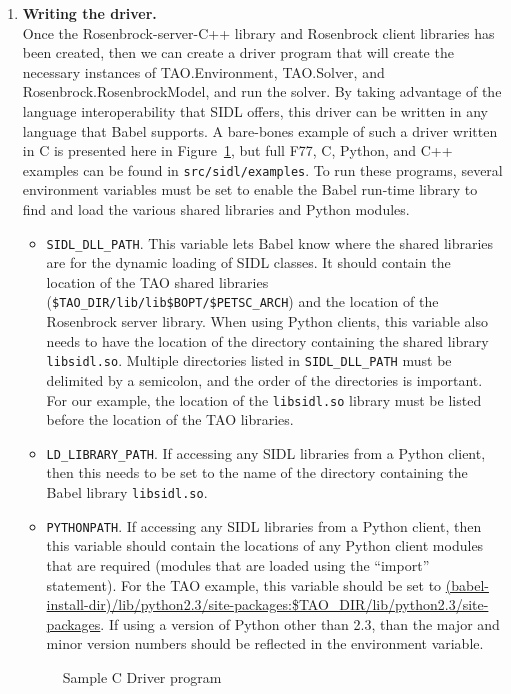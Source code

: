 \documentclass[doublespacing,12pt]{article}
\begin{document}
\begin{enumerate}
\item \textbf{Writing the driver.} \\
\label{sec:driverprogram}
Once the Rosen\-brock-server-C++ library and Rosenbrock client libraries
has been created, then we can
create a driver program that will create the necessary instances of
\textsf{TAO.En\-vi\-ron\-ment}, \textsf{TAO.Solver}, and
\textsf{Rosen\-brock.Rosen\-brockModel}, and run
the solver.  By taking advantage of the language interoperability that
SIDL offers, this driver can be written in any language that Babel
supports.
A bare-bones example of such a driver written in C is presented here in
Figure~\ref{fig:rosenbrock.c},
but full F77, C,
Python, and C++ examples can be found in \texttt{src/sidl/examples}.
To run these programs, several environment variables must be set to enable
the Babel run-time library to find and load the various shared libraries and
Python modules.
\begin{itemize}
\item \texttt{SIDL\_DLL\_PATH}.  This variable lets Babel know where the shared
libraries are for the dynamic loading of SIDL classes.  It should contain 
the location of the TAO shared libraries
(\texttt{\$TAO\_DIR/lib/lib\$BOPT/\$PETSC\_ARCH})
and the location of the Rosen\-brock server library.  When using Python clients,
this variable also needs to have the location of the directory containing
the shared library \texttt{libsidl.so}. 
Multiple directories listed in \texttt{SIDL\_DLL\_PATH} must be delimited by
a semicolon, and the order of the directories is important.  For our example,
the location of the \texttt{libsidl.so} library must be listed before the 
location of the TAO libraries.
\item \texttt{LD\_LIBRARY\_PATH}.  If accessing any SIDL libraries from a 
Python client, then this needs 
to be set to the name of the directory containing the Babel 
library \texttt{libsidl.so}.
\item \texttt{PYTHONPATH}.  If accessing any SIDL libraries from a Python 
client, then this variable should
contain the locations of any Python client modules that are required (modules
that are loaded using the ``import'' statement).  For the TAO example, this
variable should be set to
\url{(babel-install-dir)/lib/python2.3/site-packages:$TAO_DIR/lib/python2.3/site-packages}. %
If using a version of Python other than 2.3, than the major and minor
version numbers should be reflected in the environment variable.
\end{itemize}

\begin{figure}[H]
  {\footnotesize }
\caption{Sample C Driver program\label{fig:rosenbrock.c}}
\end{figure}

\end{enumerate}
\end{document}
